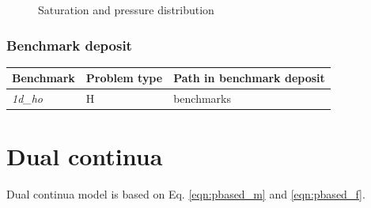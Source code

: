 \begin{figure}[h]
\begin{minipage}[t]{6 cm}
\begin{picture}
\end{picture}
\end{minipage}
\caption{Saturation and pressure distribution}
\label{us:result-DECO}
\end{figure}
\subsubsection*{Benchmark deposit}
\begin{tabular}{|l|l|l|}
  \hline
  Benchmark & Problem type & Path in benchmark deposit \\
  \hline
 \emph{1d\_ho} & H & benchmarks\verb \h_us\wet\ \\
   \hline
\end{tabular}
%
%

\section{Dual continua}
Dual continua model is based on Eq. \ref{eqn:pbased_m} and
\ref{eqn:pbased_f}.
